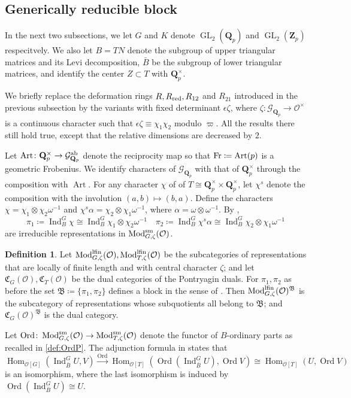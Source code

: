 \documentclass[leqno]{amsart}
\newcommand{\lfMod}{\textnormal{Mod}^{\textnormal{lfin}}}
\DeclareMathOperator{\Mod}{\textnormal{Mod}}
\newcommand{\B}{\mathfrak B}
\newcommand{\fC}{\mathfrak{C}}
\newcommand{\Gp}{\mathcal{G}_{\Qp}} %
\newcommand{\Fr}{\textnormal{Fr}} %
\DeclareMathOperator{\Ord}{Ord}
\DeclareMathOperator{\Art}{Art}
\newcommand{\sm}{\textnormal{sm}}
\newcommand{\red}{\textnormal{red}}
\DeclareMathOperator{\GL}{GL}
\newcommand{\Qp}{\mathbf{Q}_p}
\newcommand{\Zp}{\mathbf{Z}_p}
\newcommand{\oo}{\mathcal{O}} %
\DeclareMathOperator{\Hom}{Hom}
\DeclareMathOperator{\Ind}{Ind}
\theoremstyle{definition}
\newtheorem{defn}[thm]{Definition}
\theoremstyle{remark}
\begin{document}
\subsection{Generically reducible block}

In the next two subsections,
we let $G$ and  $K$
denote  $\GL_2(\Qp)$ and $\GL_2(\Zp)$
respecitvely.
We also let $B=TN$
denote the subgroup of upper triangular matrices
and its Levi decomposition,
$\bar{B}$ be
the subgroup of lower triangular matrices,
and identify the center $Z\subset T$ with $\Qp^\times$.

We briefly replace the deformation rings
$R, R_{\red}, R_{12}$ and $R_{21}$
introduced in the previous subsection
by the variants with 
fixed determinant $\epsilon\zeta$,
where $\zeta\colon \Gp\to \oo^\times$
is a continuous character 
such that  $\epsilon\zeta\equiv \chi_1\chi_2$ 
modulo $\varpi$.
All the results there
still hold true, 
except that the relative dimensions
are decreased by  $2$.

Let $\Art\colon \Qp^\times\to \Gp^{\textnormal{ab}}$
denote the reciprocity map
so that $\Fr\coloneqq \Art(p)$
is a geometric Frobenius.
We identify characters
of $\Gp$ with that of $\Qp^\times$
through the composition with $\Art$.
For any character $\chi$ of 
of $T\cong \Qp^\times\times\Qp^\times$,
let $\chi^s$
denote the composition
with the involution
$(a,b)\mapsto (b,a)$.
Define the characters
$\chi=\chi_1\otimes\chi_2\omega^{-1}$ and
$\chi^s\alpha=\chi_2\otimes \chi_1\omega^{-1}$,
where  $\alpha=\omega\otimes\omega^{-1}$.
By \cite[Thm 30]{barthel},
\[
\pi_1\coloneqq \Ind_{B}^G\chi\cong
\Ind_{B}^G\chi_1\otimes\chi_2\omega^{-1}\quad
\pi_2\coloneqq \Ind_{B}^G\chi^s\alpha\cong 
\Ind_{B}^G\chi_2\otimes\chi_1\omega^{-1} 
\]
are irreducible representations
in $\Mod^{\sm}_{G,\zeta}(\oo)$.

\begin{defn}\label{def:block}
Let $\lfMod_{G,\zeta}(\oo), \lfMod_{T,\zeta}(\oo)$
be the subcategories
of representations that are 
locally of finite length 
and with central character $\zeta$;
and let $\fC_G(\oo), \fC_T(\oo)$
be the dual categories
of the Pontryagin duals.
For $\pi_1,\pi_2$ as before
the set $\B\coloneqq\{\pi_1,\pi_2\}$ 
defines a block 
in the sense of \cite[\S 5]{pask}.
Then $\lfMod_{G,\zeta}(\oo)^\B$
is the subcategory
of representations whose subquotients
all belong to $\B$;
and $\fC_G(\oo)^\B$
is the dual category.
\end{defn}

Let $\Ord\colon \Mod_{G,\zeta}^{\sm}(\oo)
\to \Mod_{T,\zeta}^{\sm}(\oo)$
denote the functor of $B$-ordinary
parts as recalled in \eqref{def:OrdP}.
The adjunction formula
in \cite[Thm 4.4.6]{emeI} states that
\begin{equation}\label{eq:adjunct}
	\Hom_{\oo[G]}(\Ind_{\bar{B}}^GU,V)
	\xrightarrow{\Ord}
	\Hom_{\oo[T]}(\Ord(\Ind_{\bar{B}}^GU),\Ord V)
	\cong
	\Hom_{\oo[T]}(U,\Ord V)
\end{equation}
is an isomorphism, where the last isomorphism
is induced by $\Ord(\Ind_{\bar{B}}^GU)\cong U$.
\end{document}
